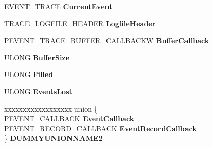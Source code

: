 \begin{DoxyCompactItemize}
\begin{tabbing}
\end{tabbing}\item 
\mbox{\label{struct___e_v_e_n_t___t_r_a_c_e___l_o_g_f_i_l_e_w_aec2d56561092121fedceae0abffefe4e}} 
\hyperlink{struct___e_v_e_n_t___t_r_a_c_e}{E\+V\+E\+N\+T\+\_\+\+T\+R\+A\+CE} {\bfseries Current\+Event}
\item 
\mbox{\label{struct___e_v_e_n_t___t_r_a_c_e___l_o_g_f_i_l_e_w_a6943ee7f0bc7930f2c82acb47c190902}} 
\hyperlink{struct___t_r_a_c_e___l_o_g_f_i_l_e___h_e_a_d_e_r}{T\+R\+A\+C\+E\+\_\+\+L\+O\+G\+F\+I\+L\+E\+\_\+\+H\+E\+A\+D\+ER} {\bfseries Logfile\+Header}
\item 
\mbox{\label{struct___e_v_e_n_t___t_r_a_c_e___l_o_g_f_i_l_e_w_a0ad406597a0682c88514394b2a328f56}} 
P\+E\+V\+E\+N\+T\+\_\+\+T\+R\+A\+C\+E\+\_\+\+B\+U\+F\+F\+E\+R\+\_\+\+C\+A\+L\+L\+B\+A\+C\+KW {\bfseries Buffer\+Callback}
\item 
\mbox{\label{struct___e_v_e_n_t___t_r_a_c_e___l_o_g_f_i_l_e_w_a8bde94cf741f0d0bb63e9e39c636aa0e}} 
U\+L\+O\+NG {\bfseries Buffer\+Size}
\item 
\mbox{\label{struct___e_v_e_n_t___t_r_a_c_e___l_o_g_f_i_l_e_w_a69f4ef73d6c2e67393f3edc65a15077d}} 
U\+L\+O\+NG {\bfseries Filled}
\item 
\mbox{\label{struct___e_v_e_n_t___t_r_a_c_e___l_o_g_f_i_l_e_w_aafea425e5f966c927e74d654634e0f15}} 
U\+L\+O\+NG {\bfseries Events\+Lost}
\item 
\mbox{\label{struct___e_v_e_n_t___t_r_a_c_e___l_o_g_f_i_l_e_w_af4f4b668868ab2b1c332ba0a69d536f8}} 
\begin{tabbing}
xx\=xx\=xx\=xx\=xx\=xx\=xx\=xx\=xx\=\kill
union \{\\
\>PEVENT\_CALLBACK {\bfseries EventCallback}\\
\>PEVENT\_RECORD\_CALLBACK {\bfseries EventRecordCallback}\\
\} {\bfseries DUMMYUNIONNAME2}\\


\end{tabbing}
\end{DoxyCompactItemize}
